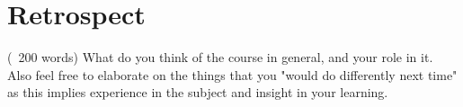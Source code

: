 \chapter{Retrospect}
\label{ch:retrospect}
(~200 words)
What do you think of the course in general, and your role in it.
Also feel free to elaborate on the things that you "would do differently next time" as this implies experience in the subject and insight in your learning.
